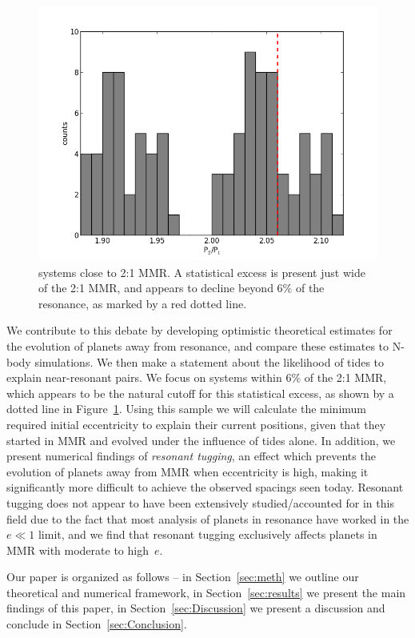 \begin{figure}
\centerline{\includegraphics[scale=0.49]{chap3/MMR.png}}
\caption{ \kep{} systems close to 2:1 MMR. A statistical excess is present just wide of the 2:1 MMR, and appears to decline beyond $6\%$ of the resonance, as marked by a red dotted line. 
 }
\label{fig:MMR}
\end{figure}

We contribute to this debate by developing optimistic theoretical estimates for the evolution of planets away from resonance, and compare these estimates to N-body simulations. 
We then make a statement about the likelihood of tides to explain near-resonant pairs. 
We focus on \kep{} systems within $6\%$ of the 2:1 MMR, which appears to be the natural cutoff for this statistical excess, as shown by a dotted line in Figure~\ref{fig:MMR}. 
Using this sample we will calculate the minimum required initial eccentricity to explain their current positions, given that they started in MMR and evolved under the influence of tides alone. 
In addition, we present numerical findings of {\it resonant tugging}, an effect which prevents the evolution of planets away from MMR when eccentricity is high, making it significantly more difficult to achieve the observed spacings seen today. 
Resonant tugging does not appear to have been extensively studied/accounted for in this field due to the fact that most analysis of planets in resonance have worked in the $e \ll 1$ limit, and we find that resonant tugging exclusively affects planets in MMR with moderate to high~$e$. 

Our paper is organized as follows -- in Section~\ref{sec:meth} we outline our theoretical and numerical framework, in Section~\ref{sec:results} we present the main findings of this paper, in Section~\ref{sec:Discussion} we present a discussion and conclude in Section~\ref{sec:Conclusion}.

